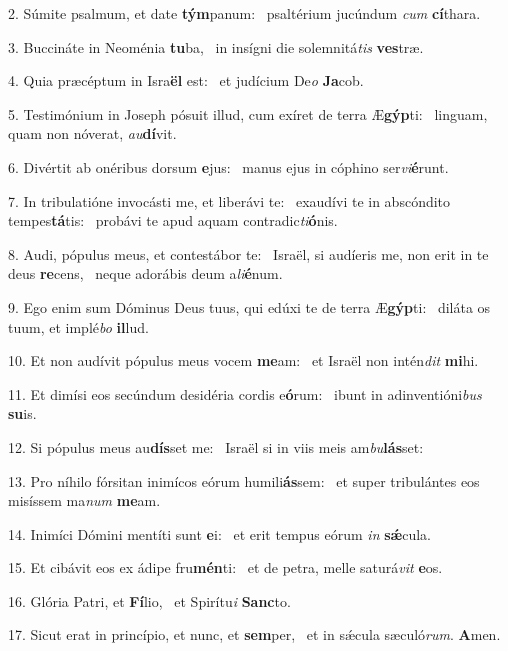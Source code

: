 2. Súmite psalmum, et date \textbf{tým}panum: \ast\  psaltérium jucúndum \textit{cum} \textbf{cí}thara.\

3. Buccináte in Neoménia \textbf{tu}ba, \ast\  in insígni die solemnitá\textit{tis} \textbf{ves}træ.\

4. Quia præcéptum in Isra\textbf{ël} est: \ast\  et judícium De\textit{o} \textbf{Ja}cob.\

5. Testimónium in Joseph pósuit illud, cum exíret de terra Æ\textbf{gýp}ti: \ast\  linguam, quam non nóverat, \textit{au}\textbf{dí}vit.\

6. Divértit ab onéribus dorsum \textbf{e}jus: \ast\  manus ejus in cóphino ser\textit{vi}\textbf{é}runt.\

7. In tribulatióne invocásti me, et liberávi te: \dag\  exaudívi te in abscóndito tempes\textbf{tá}tis: \ast\  probávi te apud aquam contradic\textit{ti}\textbf{ó}nis.\

8. Audi, pópulus meus, et contestábor te: \dag\  Israël, si audíeris me, non erit in te deus \textbf{re}cens, \ast\  neque adorábis deum a\textit{li}\textbf{é}num.\

9. Ego enim sum Dóminus Deus tuus, qui edúxi te de terra Æ\textbf{gýp}ti: \ast\  diláta os tuum, et implé\textit{bo} \textbf{il}lud.\

10. Et non audívit pópulus meus vocem \textbf{me}am: \ast\  et Israël non intén\textit{dit} \textbf{mi}hi.\

11. Et dimísi eos secúndum desidéria cordis e\textbf{ó}rum: \ast\  ibunt in adinventióni\textit{bus} \textbf{su}is.\

12. Si pópulus meus au\textbf{dís}set me: \ast\  Israël si in viis meis am\textit{bu}\textbf{lás}set:\

13. Pro níhilo fórsitan inimícos eórum humili\textbf{ás}sem: \ast\  et super tribulántes eos misíssem ma\textit{num} \textbf{me}am.\

14. Inimíci Dómini mentíti sunt \textbf{e}i: \ast\  et erit tempus eórum \textit{in} \textbf{sǽ}cula.\

15. Et cibávit eos ex ádipe fru\textbf{mén}ti: \ast\  et de petra, melle saturá\textit{vit} \textbf{e}os.\

16. Glória Patri, et \textbf{Fí}lio, \ast\  et Spirítu\textit{i} \textbf{Sanc}to.\

17. Sicut erat in princípio, et nunc, et \textbf{sem}per, \ast\  et in sǽcula sæculó\textit{rum}. \textbf{A}men.\


